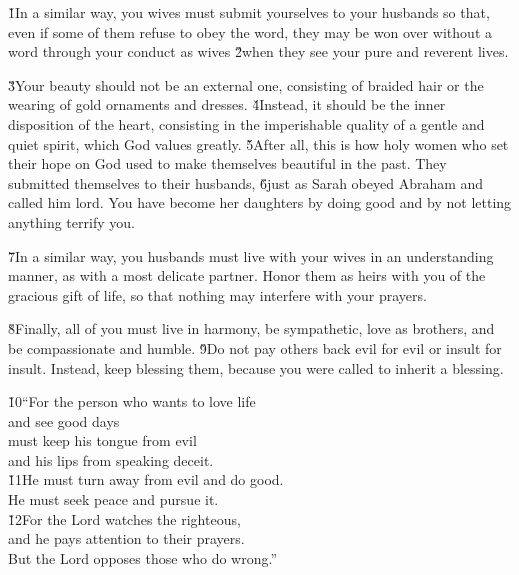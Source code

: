 \v{1}In a similar way, you wives must submit yourselves to your husbands so that, even if some of them refuse to obey the word, they may be won over without a word through your conduct as wives \v{2}when they see your pure and reverent lives.

\v{3}Your beauty should not be an external one, consisting of braided hair or the wearing of gold ornaments and dresses. \v{4}Instead, it should be the inner disposition of the heart, consisting in the imperishable quality of a gentle and quiet spirit, which God values greatly. \v{5}After all, this is how holy women who set their hope on God used to make themselves beautiful in the past. They submitted themselves to their husbands, \v{6}just as Sarah obeyed Abraham and called him lord. You have become her daughters by doing good and by not letting anything terrify you.

\v{7}In a similar way, you husbands must live with your wives in an understanding manner, as with a most delicate partner. Honor them as heirs with you of the gracious gift of life, so that nothing may interfere with your prayers.

\v{8}Finally, all of you must live in harmony, be sympathetic, love as brothers, and be compassionate and humble. \v{9}Do not pay others back evil for evil or insult for insult. Instead, keep blessing them, because you were called to inherit a blessing.

\begin{poetry}
\poeml \v{10}``For the person who wants to love life \\
\poemll    and see good days \\
\poeml must keep his tongue from evil \\
\poemll    and his lips from speaking deceit. \\
\poeml \v{11}He must turn away from evil and do good. \\
\poemll    He must seek peace and pursue it. \\
\poeml \v{12}For the Lord watches the righteous, \\
\poemll    and he pays attention to their prayers. \\
\poeml But the Lord opposes those who do wrong.''
\end{poetry}

